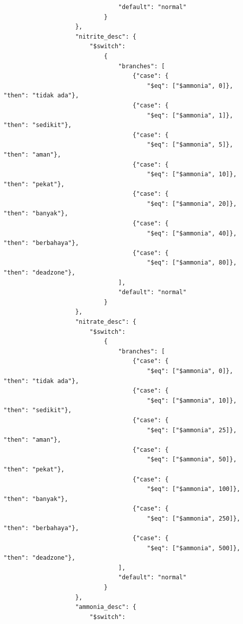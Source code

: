 \begin{enumerate}[1.]
\begin{lstlisting}
                                "default": "normal"
                            }
                    },
                    "nitrite_desc": {
                        "$switch":
                            {
                                "branches": [
                                    {"case": {
                                        "$eq": ["$ammonia", 0]}, "then": "tidak ada"},
                                    {"case": {
                                        "$eq": ["$ammonia", 1]}, "then": "sedikit"},
                                    {"case": {
                                        "$eq": ["$ammonia", 5]}, "then": "aman"},
                                    {"case": {
                                        "$eq": ["$ammonia", 10]}, "then": "pekat"},
                                    {"case": {
                                        "$eq": ["$ammonia", 20]}, "then": "banyak"},
                                    {"case": {
                                        "$eq": ["$ammonia", 40]}, "then": "berbahaya"},
                                    {"case": {
                                        "$eq": ["$ammonia", 80]}, "then": "deadzone"},
                                ],
                                "default": "normal"
                            }
                    },
                    "nitrate_desc": {
                        "$switch":
                            {
                                "branches": [
                                    {"case": {
                                        "$eq": ["$ammonia", 0]}, "then": "tidak ada"},
                                    {"case": {
                                        "$eq": ["$ammonia", 10]}, "then": "sedikit"},
                                    {"case": {
                                        "$eq": ["$ammonia", 25]}, "then": "aman"},
                                    {"case": {
                                        "$eq": ["$ammonia", 50]}, "then": "pekat"},
                                    {"case": {
                                        "$eq": ["$ammonia", 100]}, "then": "banyak"},
                                    {"case": {
                                        "$eq": ["$ammonia", 250]}, "then": "berbahaya"},
                                    {"case": {
                                        "$eq": ["$ammonia", 500]}, "then": "deadzone"},
                                ],
                                "default": "normal"
                            }
                    },
                    "ammonia_desc": {
                        "$switch":

\end{lstlisting}
\end{enumerate}
